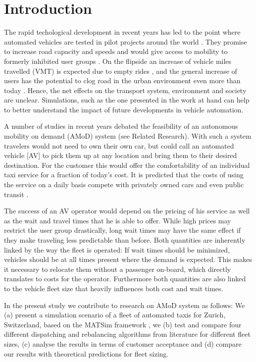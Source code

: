 \section{Introduction}

The rapid techological development in recent years has led to the point where
automated vehicles are tested in pilot projects around the world \citep{ackerman2017hail}.
They promise to increase road
capacity and speeds \citep{Tientrakool2011,Friedrich2015} and would give access to mobility to formerly
inhibited user groups \citep{Truong2017}. On the flipside an increase of vehicle
miles travelled (VMT) is expected due to empty rides \citep{Litman2014}, and the general increase
of users has the potential to clog road in the urban environment even more than today \citep{Meyer2017}.
Hence, the net effects on
the transport system, environment and society are unclear. Simulations, such as
the one presented in the work at hand can help to better understand the impact
of future developments in vehicle automation.

A number of studies in recent years debated the feasibility of an autonomous
mobility on demand (AMoD) system (see Related Research). With such a system travelers
would not need to own their own car, but could call an automated vehicle [AV] to pick
them up at any location and bring them to their desired destination. For the customer
this would offer the comfortability of an individual taxi service
for a fraction of today's cost. It is predicted that the costs of using the
service on a daily basis compete with privately owned cars and even
public transit \citep{Bosch2016a}.

The success of an AV operator would depend on the pricing of his service
as well as the wait and travel times that he is able to offer. While high prices
may restrict the user group drastically, long wait times may have the same effect
if they make traveling less predictable than before. Both quantities are inherently
linked by the way the fleet is operated: If wait times should be minimized, vehicles
should be at all times present where the demand is expected. This makes it necessary to
relocate them without a passenger on-board, which directly translates to costs for
the operator. Furthermore both quantities are also linked to the vehicle fleet
size that heavily influences both cost and wait times.

In the present study we contribute to research on AMoD system as follows: We
(a) present a simulation scenario of a fleet of automated taxis for Zurich, Switzerland,
based on the MATSim framework \citep{Horni2015}, we (b) test and compare four different dispatching
and rebalancing algorithms from literature for different fleet sizes, (c) analyse the results
in terms of customer acceptance and (d) compare our results with theoretical
predictions for fleet sizing.


